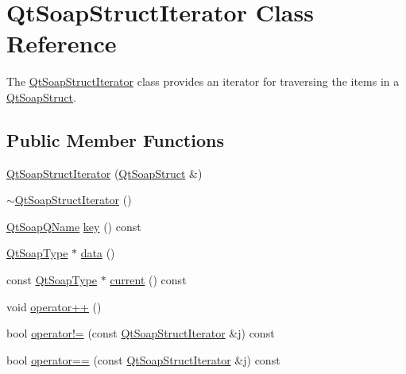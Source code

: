 \hypertarget{class_qt_soap_struct_iterator}{}\section{Qt\+Soap\+Struct\+Iterator Class Reference}
\label{class_qt_soap_struct_iterator}


The \mbox{\hyperlink{class_qt_soap_struct_iterator}{Qt\+Soap\+Struct\+Iterator}} class provides an iterator for traversing the items in a \mbox{\hyperlink{class_qt_soap_struct}{Qt\+Soap\+Struct}}.  


\subsection*{Public Member Functions}
\begin{DoxyCompactItemize}
\item 
\mbox{\hyperlink{class_qt_soap_struct_iterator_a801780ea61cb7a277f17437f5b8b16aa}{Qt\+Soap\+Struct\+Iterator}} (\mbox{\hyperlink{class_qt_soap_struct}{Qt\+Soap\+Struct}} \&)
\item 
\mbox{\hyperlink{class_qt_soap_struct_iterator_a44a363fd50c46e5a1e6a21587c02340a}{$\sim$\+Qt\+Soap\+Struct\+Iterator}} ()
\item 
\mbox{\hyperlink{class_qt_soap_q_name}{Qt\+Soap\+Q\+Name}} \mbox{\hyperlink{class_qt_soap_struct_iterator_a1e269b0e5ce56fcbb25e407e342f30f2}{key}} () const
\item 
\mbox{\hyperlink{class_qt_soap_type}{Qt\+Soap\+Type}} $\ast$ \mbox{\hyperlink{class_qt_soap_struct_iterator_a74bd8ec5fbf9f4eb5c38ded597ba07bf}{data}} ()
\item 
const \mbox{\hyperlink{class_qt_soap_type}{Qt\+Soap\+Type}} $\ast$ \mbox{\hyperlink{class_qt_soap_struct_iterator_a4701e1dc8095c8615f05aae9295101ec}{current}} () const
\item 
void \mbox{\hyperlink{class_qt_soap_struct_iterator_aa169a9d28d1c58b5139be4f329df39a9}{operator++}} ()
\item 
bool \mbox{\hyperlink{class_qt_soap_struct_iterator_ac72c400c7bcc4d6c527aed67aa675e67}{operator!=}} (const \mbox{\hyperlink{class_qt_soap_struct_iterator}{Qt\+Soap\+Struct\+Iterator}} \&j) const
\item 
bool \mbox{\hyperlink{class_qt_soap_struct_iterator_a5f2c47b1341f50f7fcf104545833d052}{operator==}} (const \mbox{\hyperlink{class_qt_soap_struct_iterator}{Qt\+Soap\+Struct\+Iterator}} \&j) const
\end{DoxyCompactItemize}


